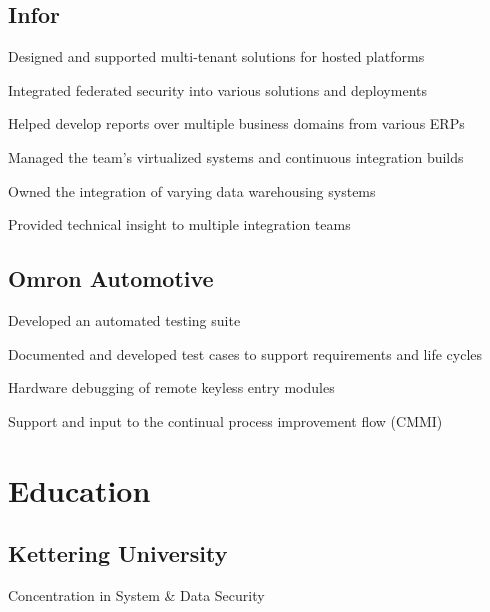 \documentclass[]{deedy-resume-openfont}
\begin{document}
\begin{minipage}[t]{0.66\textwidth}
\subsection{Infor}
\begin{tightemize}
\item Designed and supported multi-tenant solutions for hosted platforms
\item Integrated federated security into various solutions and deployments
\item Helped develop reports over multiple business domains from various ERPs
\item Managed the team's virtualized systems and continuous integration builds
\item Owned the integration of varying data warehousing systems
\item Provided technical insight to multiple integration teams
\end{tightemize}
\sectionsep

\subsection{Omron Automotive}
\begin{tightemize}
\item Developed an automated testing suite
\item Documented and developed test cases to support requirements and life cycles
\item Hardware debugging of remote keyless entry modules
\item Support and input to the continual process improvement flow (CMMI)
\end{tightemize}
\sectionsep



\section{Education}

\subsection{Kettering University}
Concentration in System \& Data Security \\
\sectionsep

\end{minipage}
\end{document}
